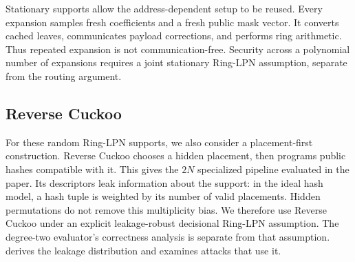 Stationary supports allow the address-dependent setup to be reused.
Every expansion samples fresh coefficients and a fresh public mask vector.
It converts cached leaves, communicates payload corrections, and performs
ring arithmetic. Thus repeated expansion is not communication-free.
Security across a polynomial number of expansions requires a joint
stationary Ring-LPN assumption, separate from the routing argument.

\subsection{Reverse Cuckoo}

For these random Ring-LPN supports, we also consider a placement-first
construction. Reverse Cuckoo chooses a hidden placement, then programs
public hashes compatible with it. This gives the $2N$ specialized pipeline
evaluated in the paper.
Its descriptors leak information about the support: in the ideal hash model,
a hash tuple is weighted by its number of valid placements.
Hidden permutations do not remove this multiplicity bias.
We therefore use Reverse Cuckoo under an explicit leakage-robust decisional
Ring-LPN assumption. The degree-two evaluator's correctness analysis is
separate from that assumption.  derives the leakage
distribution and examines attacks that use it.
